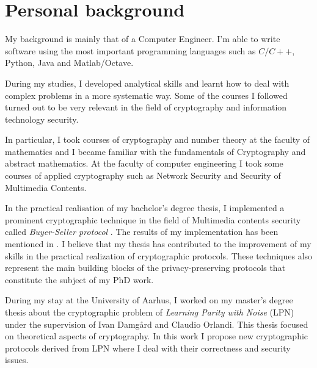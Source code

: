 \documentclass[dvips,12pt]{article}
\begin{document}
\section{Personal background}
My background is mainly that of a Computer Engineer.
I'm able to write software using the most important programming languages such as $C / C++$, Python, Java and Matlab/Octave.

During my studies, I developed analytical skills and learnt how to deal with complex problems in a more systematic way. Some of the courses I followed turned out to be very relevant in the field of cryptography and information technology security.
 
In particular, I took courses of cryptography and number theory at the faculty of mathematics and I became familiar with the fundamentals of Cryptography and abstract mathematics.
At the faculty of computer engineering I took some courses of applied cryptography such as Network Security and Security of Multimedia Contents.

In the practical realisation of my bachelor's degree thesis, I implemented a prominent cryptographic technique in the field of Multimedia contents security called \emph{Buyer-Seller protocol} \cite{tesi}. 
The results of my implementation has been mentioned in \cite{tesi2}.
I believe that my thesis has contributed to the improvement of my skills in the practical realization of  cryptographic protocols. These techniques also represent the main building blocks of the privacy-preserving protocols that constitute the subject of my PhD work.

During my stay at the University of Aarhus, I worked on my master's degree thesis about the cryptographic problem of \emph{Learning Parity with Noise} (LPN) \cite{lpn} under the supervision of Ivan Damg{\aa}rd and Claudio Orlandi. 
This thesis focused on theoretical aspects of cryptography. In this work I propose new cryptographic protocols derived from LPN where I deal with their correctness and security issues.
\end{document}
